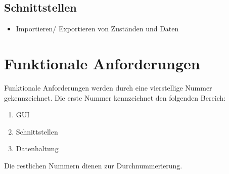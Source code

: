 \documentclass[10pt,a4paper]{article}
\begin{document}
\subsection{Schnittstellen}
\begin{itemize}
\item Importieren/ Exportieren von Zuständen und Daten
\end{itemize}


\section{Funktionale Anforderungen}
Funktionale Anforderungen werden durch eine vierstellige Nummer gekennzeichnet. Die erste Nummer kennzeichnet den folgenden Bereich:
\begin{enumerate}
	\item GUI
	\item Schnittstellen
	\item Datenhaltung
\end{enumerate}
Die restlichen Nummern dienen zur Durchnummerierung.

\newpage
\end{document}
